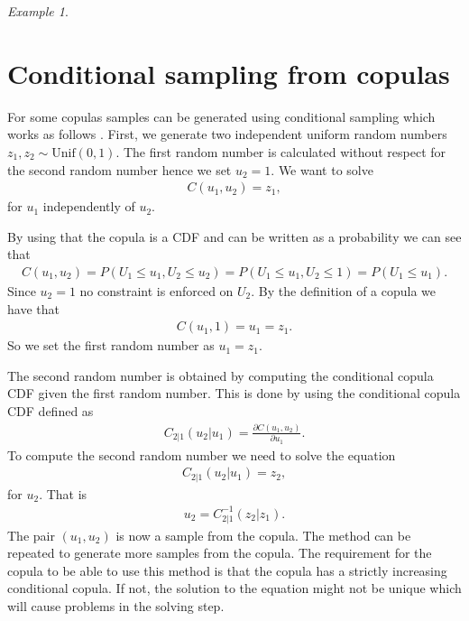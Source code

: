 \documentclass[%
a4paper,							
11pt,								
bibliography=totoc,						
abstracton=true					
]
{scrartcl}
\theoremstyle{plain}
\theoremstyle{definition}
\theoremstyle{remark}
\newtheorem{example}[theorem]{Example}
\newcommand{\1}{\mathbbm{1}}
\begin{document}
\begin{example}

\end{example}


\section{Conditional sampling from copulas}\label{sec:ConditionalSampling} 
For some copulas samples can be generated using conditional sampling which works as follows . First, we generate two independent uniform random numbers $z_1,z_2 \sim \mathrm{Unif}(0,1)$. 
The first random number is calculated without respect for the second random number hence we set $u_2 =1$. We want to solve
\begin{align*}
    C(u_1,u_2) =z_1,
\end{align*}
for $u_1$ independently of $u_2$. 

By using that the copula is a \gls{CDF} and can be written as a probability we can see that 
\begin{align*}
    C(u_1,u_2) = P(U_1\leq u_1, U_2\leq u_2) = P(U_1\leq u_1,U_2 \leq 1) = P(U_1\leq u_1).
\end{align*} 
Since $u_2 = 1$ no constraint is enforced on $U_2$. By the definition of a copula we have that 
\begin{align*}
    C(u_1,1) = u_1 = z_1.
\end{align*}
So we set the first random number as $u_1 = z_1$.

The second random number is obtained by computing the conditional copula \gls{CDF} given the first random number. This is done by using the conditional copula \gls{CDF} defined as
\begin{align*}
    C_{2|1}(u_2|u_1) = \frac{\partial C(u_1,u_2)}{\partial u_1}.
\end{align*}
To compute the second random number we need to solve the equation
\begin{align*}
    C_{2|1}(u_2|u_1) = z_2,
\end{align*}
for $u_2$. That is
\begin{align*}
    u_2 = C^{-1}_{2|1}(z_2|z_1).
\end{align*}
The pair $(u_1,u_2)$ is now a sample from the copula. The method can be repeated to generate more samples from the copula. The requirement for the copula to be able to use this method is that the copula has a strictly increasing conditional copula. If not, the solution to the equation might not be unique which will cause problems in the solving step. 
\end{document}
